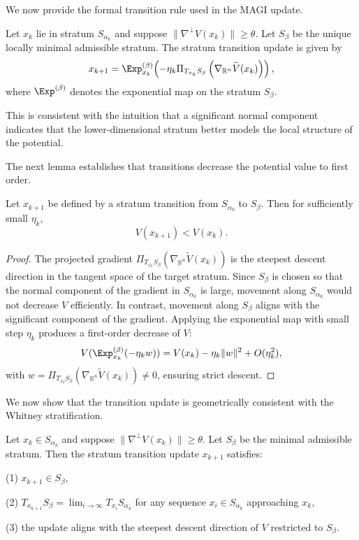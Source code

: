 \documentclass[12pt]{article}
\begin{document}
We now provide the formal transition rule used in the MAGI update.

\begin{definition}
Let $x_k$ lie in stratum $S_{\alpha_k}$ and suppose $\|\nabla^\perp V(x_k)\| \ge \theta$. Let $S_\beta$ be the unique locally minimal admissible stratum. The stratum transition update is given by
\[
x_{k+1} = \Exp_{x_k}^{(\beta)}\!\left( -\eta_k \Pi_{T_{x_k} S_\beta}\left( \nabla_{\mathbb{R}^n}\widetilde{V}(x_k) \right) \right),
\]
where $\Exp^{(\beta)}$ denotes the exponential map on the stratum $S_\beta$.
\end{definition}

This is consistent with the intuition that a significant normal component indicates that the lower-dimensional stratum better models the local structure of the potential.

The next lemma establishes that transitions decrease the potential value to first order.

\begin{lemma}
Let $x_{k+1}$ be defined by a stratum transition from $S_{\alpha_k}$ to $S_\beta$. Then for sufficiently small $\eta_k$,
\[
V(x_{k+1}) < V(x_k).
\]
\end{lemma}

\begin{proof}
The projected gradient $\Pi_{T_{x_k}S_\beta}(\nabla_{\mathbb{R}^n}\widetilde{V}(x_k))$ is the steepest descent direction in the tangent space of the target stratum. Since $S_\beta$ is chosen so that the normal component of the gradient in $S_{\alpha_k}$ is large, movement along $S_{\alpha_k}$ would not decrease $V$ efficiently. In contrast, movement along $S_\beta$ aligns with the significant component of the gradient. Applying the exponential map with small step $\eta_k$ produces a first-order decrease of $V$:
\[
V(\Exp_{x_k}^{(\beta)}(-\eta_k w)) = V(x_k) - \eta_k\|w\|^2 + O(\eta_k^2),
\]
with $w = \Pi_{T_{x_k}S_\beta}(\nabla_{\mathbb{R}^n}\widetilde{V}(x_k)) \neq 0$, ensuring strict descent.
\end{proof}

We now show that the transition update is geometrically consistent with the Whitney stratification.

\begin{theorem}
Let $x_k \in S_{\alpha_k}$ and suppose $\|\nabla^\perp V(x_k)\| \ge \theta$. Let $S_\beta$ be the minimal admissible stratum. Then the stratum transition update $x_{k+1}$ satisfies:

(1) $x_{k+1} \in S_\beta$,

(2) $T_{x_{k+1}} S_\beta = \lim_{i \to \infty} T_{x_i} S_{\alpha_k}$ for any sequence $x_i \in S_{\alpha_k}$ approaching $x_k$,

(3) the update aligns with the steepest descent direction of $V$ restricted to $S_\beta$.

\end{theorem}
\end{document}
